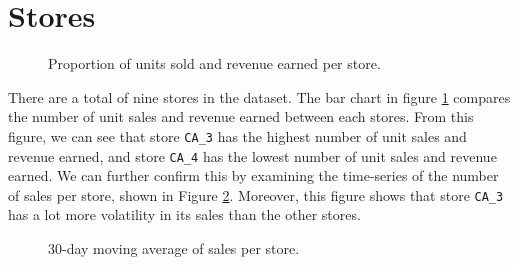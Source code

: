 \section{Stores}
\begin{figure}
    \vspace{-15pt}
    \centering
    \captionsetup{width=0.52\textwidth}
    \caption{Proportion of units sold and revenue earned per store.}
    \label{fig:sales_rev_stores}
    \vspace{-20pt}
\end{figure}
There are a total of nine stores in the dataset.
The bar chart in figure \ref{fig:sales_rev_stores} compares the number of unit sales and revenue earned between each stores.
From this figure, we can see that store \texttt{CA\_3} has the highest number of unit sales and revenue earned, and store \texttt{CA\_4} has the lowest number of unit sales and revenue earned.
We can further confirm this by examining the time-series of the number of sales per store, shown in Figure \ref{fig:store_sales}.
Moreover, this figure shows that store \texttt{CA\_3} has a lot more volatility in its sales than the other stores.

\begin{figure}[b!]
    \centering
    \caption{30-day moving average of sales per store.}
    \label{fig:store_sales}
\end{figure} 


